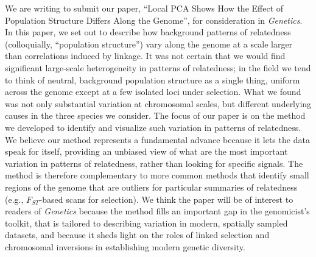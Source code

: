 \documentclass[stdletter,letterpaper,addrfromright,orderfromdateto,dateleft,11pt,noaddrto,sigleft]{newlfm}
\begin{document}
\begin{newlfm}




We are writing to submit our paper,
``Local PCA Shows How the Effect of Population Structure Differs Along the Genome'',
for consideration in \textit{Genetics}.
In this paper, we set out to describe how background patterns of relatedness 
(colloquially, ``population structure'')
vary along the genome at a scale larger than correlations induced by linkage.
It was not certain that we would find significant large-scale heterogeneity in patterns of relatedness;
in the field we tend to think of neutral, background population structure as a single thing,
uniform across the genome except at a few isolated loci under selection.
What we found was not only substantial variation at chromosomal scales,
but different underlying causes in the three species we consider.
The focus of our paper is on the method we developed to identify and visualize such variation in patterns of relatedness.
We believe our method represents a fundamental advance because it lets the data speak for itself,
providing an unbiased view of what are the most important variation in patterns of relatedness,
rather than looking for specific signals.
The method is therefore complementary to more common methods that identify small regions of the genome
that are outliers for particular summaries of relatedness (e.g., $F_{ST}$-based scans for selection).
We think the paper will be of interest to readers of \textit{Genetics}
because the method fills an important gap in the genomicist's toolkit,
that is tailored to describing variation in modern, spatially sampled datasets,
and because it sheds light on the roles of linked selection and chromosomal inversions in 
establishing modern genetic diversity.


\end{newlfm}
\end{document}

